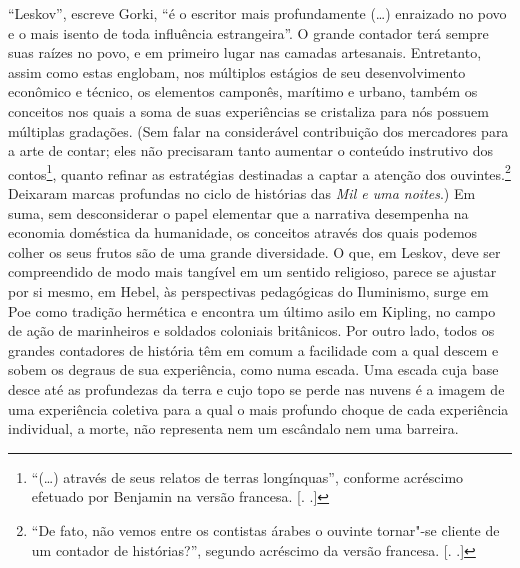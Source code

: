 ``Leskov'', escreve Gorki, ``é o escritor mais profundamente (\ldots{})
enraizado no povo e o mais isento de toda influência estrangeira''. O
grande contador terá sempre suas raízes no povo, e em primeiro lugar nas
camadas artesanais. Entretanto, assim como estas englobam, nos múltiplos
estágios de seu desenvolvimento econômico e técnico, os elementos
camponês, marítimo e urbano, também os conceitos nos quais a soma de
suas experiências se cristaliza para nós possuem múltiplas gradações. 
(Sem falar na considerável contribuição dos mercadores para a arte de
contar; eles não precisaram tanto aumentar o conteúdo instrutivo dos
contos\footnote{``(\ldots{}) através de seus relatos de terras longínquas'',
  conforme acréscimo efetuado por Benjamin na versão francesa. [. 
  .]}, quanto refinar as estratégias destinadas a captar a atenção
dos ouvintes.\footnote{``De fato, não vemos entre os contistas árabes o
  ouvinte tornar"-se cliente de um contador de histórias?'', segundo
  acréscimo da versão francesa. [. .]} Deixaram marcas
profundas no ciclo de histórias das \emph{Mil e uma noites}.) Em suma,
sem desconsiderar o papel elementar que a narrativa desempenha na
economia doméstica da humanidade, os conceitos através dos quais podemos
colher os seus frutos são de uma grande diversidade. O que, em Leskov,
deve ser compreendido de modo mais tangível em um sentido religioso,
parece se ajustar por si mesmo, em Hebel, às perspectivas pedagógicas do
Iluminismo, surge em Poe como tradição hermética e encontra um último
asilo em Kipling, no campo de ação de marinheiros e soldados coloniais
britânicos. Por outro lado, todos os grandes contadores de história têm
em comum a facilidade com a qual descem e sobem os degraus de sua
experiência, como numa escada. Uma escada cuja base desce até as
profundezas da terra e cujo topo se perde nas nuvens é a imagem de uma
experiência coletiva para a qual o mais profundo choque de cada
experiência individual, a morte, não representa nem um escândalo nem uma
barreira.

